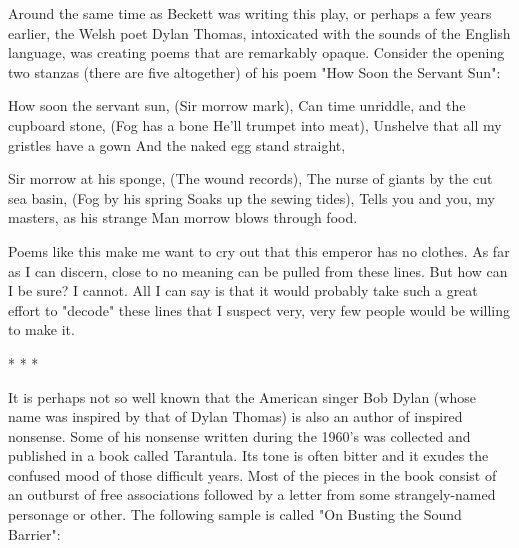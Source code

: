         Around the same time as Beckett was writing this play, or perhaps a few years
earlier, the Welsh poet Dylan Thomas, intoxicated with the sounds of the English
language, was creating poems that are remarkably opaque. Consider the opening two
stanzas (there are five altogether) of his poem "How Soon the Servant Sun":

               How soon the servant sun,
               (Sir morrow mark),
               Can time unriddle, and the cupboard stone,
               (Fog has a bone
               He'll trumpet into meat),
               Unshelve that all my gristles have a gown
               And the naked egg stand straight,





               Sir morrow at his sponge,
               (The wound records),
               The nurse of giants by the cut sea basin,
               (Fog by his spring
               Soaks up the sewing tides),
               Tells you and you, my masters, as his strange
               Man morrow blows through food.

Poems like this make me want to cry out that this emperor has no clothes. As far as I can
discern, close to no meaning can be pulled from these lines. But how can I be sure? I
cannot. All I can say is that it would probably take such a great effort to "decode" these
lines that I suspect very, very few people would be willing to make it.

                                         *   *   *

         It is perhaps not so well known that the American singer Bob Dylan (whose name
was inspired by that of Dylan Thomas) is also an author of inspired nonsense. Some of
his nonsense written during the 1960's was collected and published in a book called
Tarantula. Its tone is often bitter and it exudes the confused mood of those difficult years.
Most of the pieces in the book consist of an outburst of free associations followed by a
letter from some strangely-named personage or other. The following sample is called "On
Busting the Sound Barrier":

